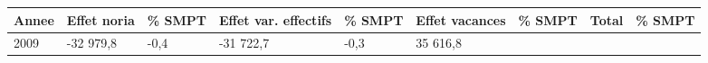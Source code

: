 \begin{longtable}[]{@{}lllllllll@{}}
\toprule
\begin{minipage}[b]{0.05\columnwidth}\raggedright
Annee\strut
\end{minipage} & \begin{minipage}[b]{0.10\columnwidth}\raggedright
Effet noria\strut
\end{minipage} & \begin{minipage}[b]{0.06\columnwidth}\raggedright
\% SMPT\strut
\end{minipage} & \begin{minipage}[b]{0.16\columnwidth}\raggedright
Effet var. effectifs\strut
\end{minipage} & \begin{minipage}[b]{0.06\columnwidth}\raggedright
\% SMPT\strut
\end{minipage} & \begin{minipage}[b]{0.12\columnwidth}\raggedright
Effet vacances\strut
\end{minipage} & \begin{minipage}[b]{0.06\columnwidth}\raggedright
\% SMPT\strut
\end{minipage} & \begin{minipage}[b]{0.09\columnwidth}\raggedright
Total\strut
\end{minipage} & \begin{minipage}[b]{0.06\columnwidth}\raggedright
\% SMPT\strut
\end{minipage}\tabularnewline
\midrule
\endhead
\begin{minipage}[t]{0.05\columnwidth}\raggedright
2009\strut
\end{minipage} & \begin{minipage}[t]{0.10\columnwidth}\raggedright
-32 979,8\strut
\end{minipage} & \begin{minipage}[t]{0.06\columnwidth}\raggedright
-0,4\strut
\end{minipage} & \begin{minipage}[t]{0.16\columnwidth}\raggedright
-31 722,7\strut
\end{minipage} & \begin{minipage}[t]{0.06\columnwidth}\raggedright
-0,3\strut
\end{minipage} & \begin{minipage}[t]{0.12\columnwidth}\raggedright
35 616,8\strut
\end{minipage} & \begin{minipage}[t]{0.06\columnwidth}\raggedright

\end{minipage}
\end{longtable}
